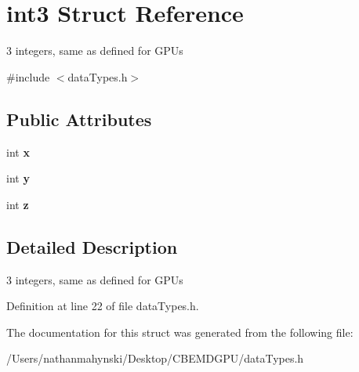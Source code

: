 \hypertarget{structint3}{\section{int3 Struct Reference}
\label{structint3}
}


3 integers, same as defined for G\-P\-Us  




{\ttfamily \#include $<$data\-Types.\-h$>$}

\subsection*{Public Attributes}
\begin{DoxyCompactItemize}
\item 
\hypertarget{structint3_a0a4ad50a155a35fa938ce6f16930affa}{int {\bfseries x}}\label{structint3_a0a4ad50a155a35fa938ce6f16930affa}

\item 
\hypertarget{structint3_a5d95e23491677d61019f0354b16adca9}{int {\bfseries y}}\label{structint3_a5d95e23491677d61019f0354b16adca9}

\item 
\hypertarget{structint3_a5cd5a3c388fa28814e3496ef07c39360}{int {\bfseries z}}\label{structint3_a5cd5a3c388fa28814e3496ef07c39360}

\end{DoxyCompactItemize}


\subsection{Detailed Description}
3 integers, same as defined for G\-P\-Us 

Definition at line 22 of file data\-Types.\-h.



The documentation for this struct was generated from the following file\-:\begin{DoxyCompactItemize}
\item 
/\-Users/nathanmahynski/\-Desktop/\-C\-B\-E\-M\-D\-G\-P\-U/data\-Types.\-h\end{DoxyCompactItemize}
